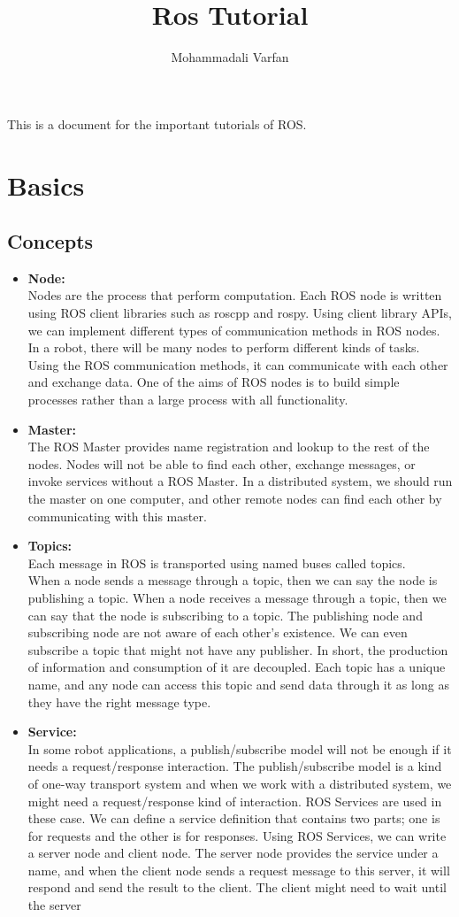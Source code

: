\documentclass[•]{article}
\title{Ros Tutorial}
\author{Mohammadali Varfan}
\begin{document}
\maketitle
This is a document for the important tutorials of ROS.

\section{Basics}

\subsection{Concepts}
\begin{itemize}
\item \textbf{Node:}\\
Nodes are the process that perform computation. Each ROS node is
written using ROS client libraries such as roscpp and rospy. Using client library APIs, we can implement different types of communication methods in ROS nodes. In a robot, there will be many nodes to perform different kinds of tasks. Using the ROS communication methods, it can communicate with each other and exchange data. One of the aims of ROS nodes is to build simple processes rather than a large process with all functionality.
\item \textbf{Master:}\\
The ROS Master provides name registration and lookup to the rest
of the nodes. Nodes will not be able to find each other, exchange messages, or invoke services without a ROS Master. In a distributed system, we should run the master on one computer, and other remote nodes can find each other by communicating with this master.
\item \textbf{Topics:}\\
Each message in ROS is transported using named buses called
topics.\\
When a node sends a message through a topic, then we can say the node is publishing a topic. When a node receives a message through a topic, then we can say that the node is subscribing to a topic. The publishing node and subscribing node are not aware of each other's existence. We can even subscribe a topic that might not have any publisher. In short, the production of information and consumption of it are decoupled. Each topic has a unique name, and any node can access this topic and send data through it as long as they have the right message type.
\item \textbf{Service:}\\
In some robot applications, a publish/subscribe model will not be
enough if it needs a request/response interaction. The publish/subscribe model is a kind of one-way transport system and when we work with a distributed system, we might need a request/response kind of interaction. ROS Services are used in these case. We can define a service definition that contains two parts; one is for requests and the other is for responses. Using ROS Services, we can write a server node and client node. The server node provides the service under a name, and when the client node sends a request message to this server, it will respond and send the result to the client. The client might need to wait until the server


\end{itemize}
\end{document}
